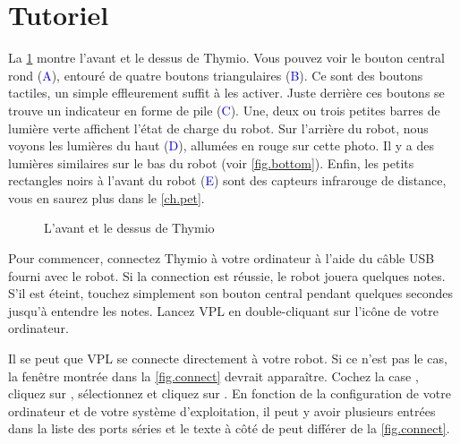 \part{Tutoriel}
\label{ch.intro}


La \cref{fig.front} montre l'avant et le dessus de Thymio.
Vous pouvez voir le bouton central rond (\textcolor{blue}{A}), entouré de quatre boutons triangulaires (\textcolor{blue}{B}).
Ce sont des boutons tactiles, un simple effleurement suffit à les activer.
Juste derrière ces boutons se trouve un indicateur en forme de pile (\textcolor{blue}{C}).
Une, deux ou trois petites barres de lumière verte affichent l'état de charge du robot.
Sur l'arrière du robot, nous voyons les lumières du haut (\textcolor{blue}{D}), allumées en rouge sur cette photo.
Il y a des lumières similaires sur le bas du robot (voir \cref{fig.bottom}).
Enfin, les petits rectangles noirs à l'avant du robot (\textcolor{blue}{E}) sont des capteurs infrarouge de distance, vous en saurez plus dans le \cref{ch.pet}.

\begin{figure}[h]
\begin{center}
\caption{L'avant et le dessus de Thymio}\label{fig.front}
\end{center}
\end{figure} 


Pour commencer, connectez Thymio à votre ordinateur à l'aide du câble USB fourni avec le robot.
Si la connection est réussie, le robot jouera quelques notes.
S'il est éteint, touchez simplement son bouton central pendant quelques secondes jusqu'à entendre les notes.
Lancez VPL en double-cliquant sur l'icône  de votre ordinateur.



Il se peut que VPL se connecte directement à votre robot.
Si ce n'est pas le cas, la fenêtre montrée dans la \cref{fig.connect} devrait apparaître.
Cochez la case , cliquez sur , sélectionnez  et cliquez sur .
En fonction de la configuration de votre ordinateur et de votre système d'exploitation, il peut y avoir plusieurs entrées dans la liste des ports séries et le texte à côté de  peut différer de la \cref{fig.connect}.

